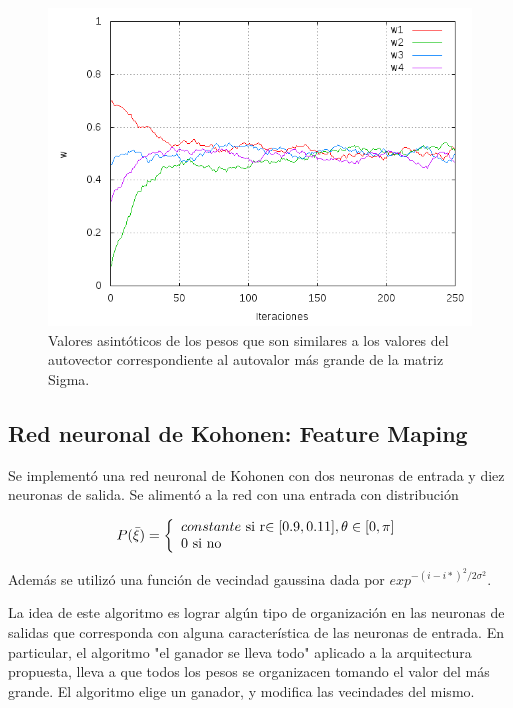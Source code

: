 \documentclass[aps,prb,onecolumn,10pt,floatfix,superscriptaddress]{article} %
\begin{document}
\begin{figure}[!htd] 
   	\begin{center}
   	\includegraphics[scale=0.4 ]{apren1.png}
  \caption{\label{apren1} Valores asint\'oticos de los pesos que son similares a los valores del autovector correspondiente al autovalor m\'as grande de la matriz Sigma.}
    \end{center}
 \end{figure}

\subsection{Red neuronal de Kohonen: Feature Maping}

Se implement\'o una red neuronal de Kohonen con dos neuronas de entrada y diez neuronas de salida. Se aliment\'o a la red con una entrada con distribuci\'on 

\begin{equation}
P(\bar{\xi}) = 
\left\lbrace 
\begin{array}{l}
constante $ si r$ \in [0.9,0.11],\theta \in [0,\pi]\\
0 $ si no$   
\end{array}\right. 
\end{equation}

Adem\'as se utiliz\'o una funci\'on de vecindad gaussina dada por $exp^{-(i-i*)^{2}/2\sigma^2}$.

La idea de este algoritmo es lograr alg\'un tipo de organizaci\'on en las neuronas de salidas que corresponda con alguna caracter\'istica de las neuronas de entrada. En particular, el algoritmo "el ganador se lleva todo" aplicado a la arquitectura propuesta, lleva a que todos los pesos se organizacen tomando el valor del m\'as grande. El algoritmo elige un ganador, y modifica las vecindades del mismo. 
\end{document}
